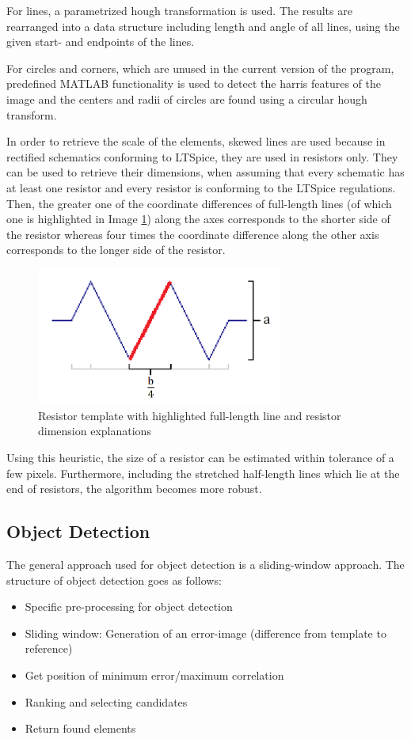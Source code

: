 \documentclass[10pt,twocolumn,letterpaper]{article}
\begin{document}
For lines, a parametrized hough transformation is used. The results are rearranged into a data structure including length and angle of all lines, using the given start- and endpoints of the lines.
\par
For circles and corners, which are unused in the current version of the program, predefined MATLAB functionality is used to detect the harris features of the image and the centers and radii of circles are found using a circular hough transform.
\par
In order to retrieve the scale of the elements, skewed lines are used because in rectified schematics conforming to LTSpice, they are used in resistors only. They can be used to retrieve their dimensions, when assuming that every schematic has at least one resistor and every resistor is conforming to the LTSpice regulations. Then, the greater one of the coordinate differences of full-length lines (of which one is highlighted in Image \ref{fig:c9}) along the axes corresponds to the shorter side of the resistor whereas four times the coordinate difference along the other axis corresponds to the longer side of the resistor.
\par

\begin{figure}[!ht]
\includegraphics[width = 3.2in]{img/resdim.png}
\caption{Resistor template with highlighted full-length line and resistor dimension explanations}
\label{fig:c9}
\end{figure}

\par
Using this heuristic, the size of a resistor can be estimated within tolerance of a few pixels. Furthermore, including the stretched half-length lines which lie at the end of resistors, the algorithm becomes more robust.

\subsection{Object Detection}
\label{subsec:obj}

The general approach used for object detection is a sliding-window approach. The structure of object detection goes as follows: 
\begin{itemize}
	\item Specific pre-processing for object detection
	\item Sliding window: Generation of an error-image (difference from template to reference)
	\item Get position of minimum error/maximum correlation
	\item Ranking and selecting candidates
	\item Return found elements
\end{itemize}
\end{document}

